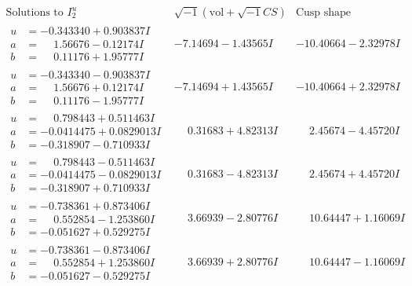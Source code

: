 \documentclass[1p]{elsarticle_modified}
\theoremstyle{definition}
\newcommand{\I}{\sqrt{-1}}
\begin{document}
$$\begin{array}{c|c|c}  
\text{Solutions to }I^u_{2}& \I (\text{vol} + \sqrt{-1}CS) & \text{Cusp shape}\\
 \hline 
\begin{aligned}
u &= -0.343340 + 0.903837 I \\
a &= \phantom{-}1.56676 - 0.12174 I \\
b &= \phantom{-}0.11176 + 1.95777 I\end{aligned}
 & -7.14694 - 1.43565 I & -10.40664 - 2.32978 I \\ \hline\begin{aligned}
u &= -0.343340 - 0.903837 I \\
a &= \phantom{-}1.56676 + 0.12174 I \\
b &= \phantom{-}0.11176 - 1.95777 I\end{aligned}
 & -7.14694 + 1.43565 I & -10.40664 + 2.32978 I \\ \hline\begin{aligned}
u &= \phantom{-}0.798443 + 0.511463 I \\
a &= -0.0414475 + 0.0829013 I \\
b &= -0.318907 - 0.710933 I\end{aligned}
 & \phantom{-}0.31683 + 4.82313 I & \phantom{-}2.45674 - 4.45720 I \\ \hline\begin{aligned}
u &= \phantom{-}0.798443 - 0.511463 I \\
a &= -0.0414475 - 0.0829013 I \\
b &= -0.318907 + 0.710933 I\end{aligned}
 & \phantom{-}0.31683 - 4.82313 I & \phantom{-}2.45674 + 4.45720 I \\ \hline\begin{aligned}
u &= -0.738361 + 0.873406 I \\
a &= \phantom{-}0.552854 - 1.253860 I \\
b &= -0.051627 + 0.529275 I\end{aligned}
 & \phantom{-}3.66939 - 2.80776 I & \phantom{-}10.64447 + 1.16069 I \\ \hline\begin{aligned}
u &= -0.738361 - 0.873406 I \\
a &= \phantom{-}0.552854 + 1.253860 I \\
b &= -0.051627 - 0.529275 I\end{aligned}
 & \phantom{-}3.66939 + 2.80776 I & \phantom{-}10.64447 - 1.16069 I \\ \hline\begin{aligned}

\end{aligned}
\end{array}$$
\end{document}
